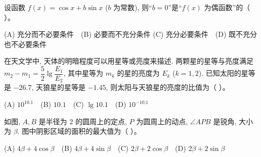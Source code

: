 \begin{question}
设函数 $f(x) = \cos x + b \sin x$ ($b$ 为常数), 则“$b = 0$”是“$f(x)$ 为偶函数”的（ ）。

(A) 充分而不必要条件　(B) 必要而不充分条件
(C) 充分必要条件　(D) 既不充分也不必要条件

\end{question}
\begin{question}
在天文学中, 天体的明暗程度可以用星等或亮度来描述. 两颗星的星等与亮度满足 $m_2 - m_1 = \dfrac{5}{2}\lg \dfrac{E_1}{E_2}$, 其中星等为 $m_k$ 的星的亮度为 $E_k$ ($k = 1, 2$). 已知太阳的星等是 $-26.7$, 天狼星的星等是 $-1.45$, 则太阳与天狼星的亮度的比值为（ ）。

(A) $10^{10.1}$　(B) $10.1$　(C) $\lg 10.1$　(D) $10^{-10.1}$

\Needspace{0.4\textheight}
\end{question}
\begin{question}
如图, $A, B$ 是半径为 $2$ 的圆周上的定点, $P$ 为圆周上的动点, $\angle APB$ 是锐角, 大小为 $\beta$. 图中阴影区域的面积的最大值为（ ）。
\nopagebreak[4]
\begin{center}\end{center}
\nopagebreak[4]
(A) $4\beta + 4\cos\beta$　(B) $4\beta + 4\sin\beta$　(C) $2\beta + 2\cos\beta$　(D) $2\beta + 2\sin\beta$

\par\medskip

\end{question}

